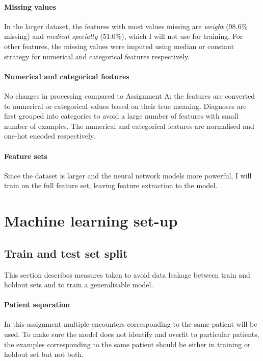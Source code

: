\documentclass[10pt, twocolumn]{article}
\begin{document}
\paragraph{Missing values} In the larger dataset, the features with most values missing are \textit{weight} (98.6\% missing) and \textit{medical specialty} (51.0\%), which I will not use for training. For other features, the missing values were imputed using median or constant strategy for numerical and categorical features respectively.

\paragraph{Numerical and categorical features} No changes in processing compared to Assignment A: the features are converted to numerical or categorical values based on their true meaning. Diagnoses are first grouped into categories to avoid a large number of features with small number of examples. The numerical and categorical features are normalised and one-hot encoded respectively.

\paragraph{Feature sets} Since the dataset is larger and the neural network models more powerful, I will train on the full feature set, leaving feature extraction to the model.

\section{Machine learning set-up}

\subsection{Train and test set split}
This section describes measures taken to avoid data leakage between train and holdout sets and to train a generalisable model.

\paragraph{Patient separation} In this assignment multiple encounters corresponding to the same patient will be used. To make sure the model does not identify and overfit to particular patients, the examples corresponding to the same patient should be either in training or holdout set but not both.
\end{document}
